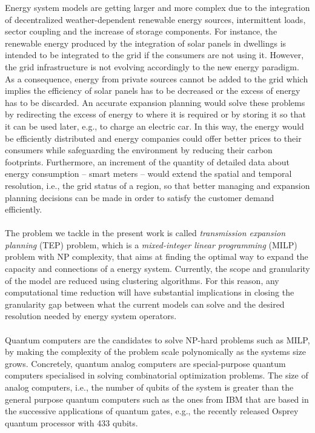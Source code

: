 Energy system models are getting larger and more complex due to the integration of decentralized weather-dependent renewable energy sources, intermittent loads, sector coupling and the increase of storage components. For instance, the renewable energy produced by the integration of solar panels in dwellings is intended to be integrated to the grid if the consumers are not using it. However, the grid infrastructure is not evolving accordingly to the new energy paradigm. As a consequence, energy from private sources cannot be added to the grid which implies the efficiency of solar panels has to be decreased or the excess of energy has to be discarded. An accurate expansion planning would solve these problems by redirecting the excess of energy to where it is required or by storing it so that it can be used later, e.g., to charge an electric car. In this way, the energy would be efficiently distributed and energy companies could offer better prices to their consumers while safeguarding the environment by reducing their carbon footprints. Furthermore, an increment of the quantity of detailed data about energy consumption -- smart meters -- would extend the spatial and temporal resolution, i.e., the grid status of a region, so that better managing and expansion planning decisions can be made in order to satisfy the customer demand efficiently.\\\\ 
The problem we tackle in the present work is called \textit{transmission expansion planning} (TEP) problem, which is a \textit{mixed-integer linear programming} (MILP) problem with NP complexity, that aims at finding the optimal way to expand the capacity and connections of a energy system. Currently, the scope and granularity of the model are reduced using clustering algorithms. For this reason, any computational time reduction will have substantial implications in closing the granularity gap between what the current models can solve and the desired resolution needed by energy system operators.\\\\
Quantum computers are the candidates to solve NP-hard problems such as MILP, by making the complexity of the problem scale polynomically as the systems size grows. Concretely, quantum analog computers are special-purpose quantum computers specialised in solving combinatorial optimization problems. The size of analog computers, i.e., the number of qubits of the system is greater than the general purpose quantum computers such as the ones from IBM that are based in the successive applications of quantum gates, e.g., the recently released Osprey quantum processor with 433 qubits.
